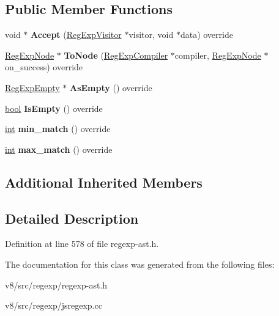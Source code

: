 \subsection*{Public Member Functions}
\begin{DoxyCompactItemize}
\item 
\mbox{\label{classv8_1_1internal_1_1RegExpEmpty_adb9b9eff91edaa55fa66350bb41d7ba6}} 
void $\ast$ {\bfseries Accept} (\mbox{\hyperlink{classv8_1_1internal_1_1RegExpVisitor}{Reg\+Exp\+Visitor}} $\ast$visitor, void $\ast$data) override
\item 
\mbox{\label{classv8_1_1internal_1_1RegExpEmpty_a65ca3cea4c5bbe28078769d9998887aa}} 
\mbox{\hyperlink{classv8_1_1internal_1_1RegExpNode}{Reg\+Exp\+Node}} $\ast$ {\bfseries To\+Node} (\mbox{\hyperlink{classv8_1_1internal_1_1RegExpCompiler}{Reg\+Exp\+Compiler}} $\ast$compiler, \mbox{\hyperlink{classv8_1_1internal_1_1RegExpNode}{Reg\+Exp\+Node}} $\ast$on\+\_\+success) override
\item 
\mbox{\label{classv8_1_1internal_1_1RegExpEmpty_a8b93772851e79941082610b501605bbd}} 
\mbox{\hyperlink{classv8_1_1internal_1_1RegExpEmpty}{Reg\+Exp\+Empty}} $\ast$ {\bfseries As\+Empty} () override
\item 
\mbox{\label{classv8_1_1internal_1_1RegExpEmpty_af07b7a1f4f8ec094066fc53b4e5701bd}} 
\mbox{\hyperlink{classbool}{bool}} {\bfseries Is\+Empty} () override
\item 
\mbox{\label{classv8_1_1internal_1_1RegExpEmpty_a8e3513c004366ac7d333fa462eb9b059}} 
\mbox{\hyperlink{classint}{int}} {\bfseries min\+\_\+match} () override
\item 
\mbox{\label{classv8_1_1internal_1_1RegExpEmpty_ac4b2cb73f78ceb2fd6ebe6118c9a10cf}} 
\mbox{\hyperlink{classint}{int}} {\bfseries max\+\_\+match} () override
\end{DoxyCompactItemize}
\subsection*{Additional Inherited Members}


\subsection{Detailed Description}


Definition at line 578 of file regexp-\/ast.\+h.



The documentation for this class was generated from the following files\+:\begin{DoxyCompactItemize}
\item 
v8/src/regexp/regexp-\/ast.\+h\item 
v8/src/regexp/jsregexp.\+cc\end{DoxyCompactItemize}
